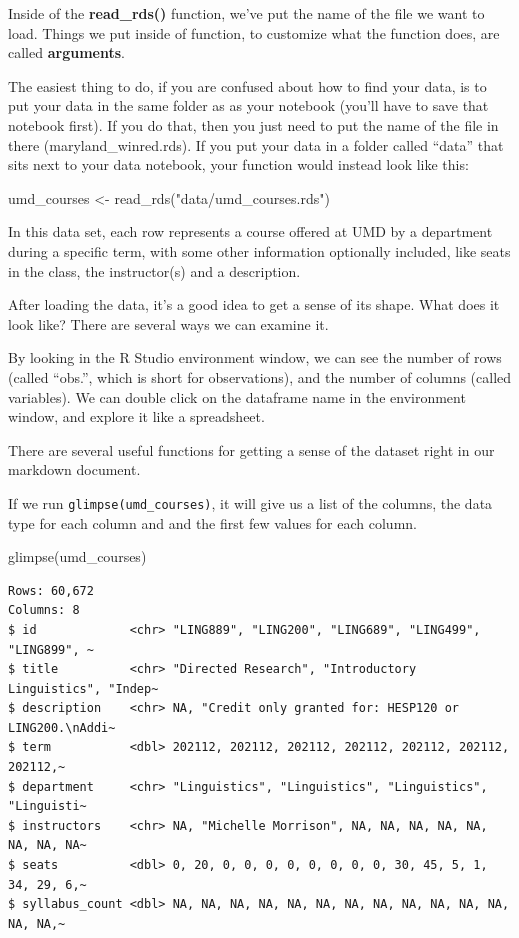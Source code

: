 \documentclass[
  letterpaper,
  DIV=11,
  numbers=noendperiod]{scrreprt}
\newenvironment{Shaded}{\begin{snugshade}}{\end{snugshade}}
\newcommand{\FunctionTok}[1]{\textcolor[rgb]{0.28,0.35,0.67}{#1}}
\newcommand{\NormalTok}[1]{\textcolor[rgb]{0.00,0.23,0.31}{#1}}
\newcommand{\OtherTok}[1]{\textcolor[rgb]{0.00,0.23,0.31}{#1}}
\newcommand{\StringTok}[1]{\textcolor[rgb]{0.13,0.47,0.30}{#1}}
\begin{document}
Inside of the \textbf{read\_rds()} function, we've put the name of the
file we want to load. Things we put inside of function, to customize
what the function does, are called \textbf{arguments}.

The easiest thing to do, if you are confused about how to find your
data, is to put your data in the same folder as as your notebook (you'll
have to save that notebook first). If you do that, then you just need to
put the name of the file in there (maryland\_winred.rds). If you put
your data in a folder called ``data'' that sits next to your data
notebook, your function would instead look like this:

\begin{Shaded}
\begin{Highlighting}[]
\NormalTok{umd\_courses }\OtherTok{\textless{}{-}} \FunctionTok{read\_rds}\NormalTok{(}\StringTok{"data/umd\_courses.rds"}\NormalTok{)}
\end{Highlighting}
\end{Shaded}

In this data set, each row represents a course offered at UMD by a
department during a specific term, with some other information
optionally included, like seats in the class, the instructor(s) and a
description.

After loading the data, it's a good idea to get a sense of its shape.
What does it look like? There are several ways we can examine it.

By looking in the R Studio environment window, we can see the number of
rows (called ``obs.'', which is short for observations), and the number
of columns (called variables). We can double click on the dataframe name
in the environment window, and explore it like a spreadsheet.

There are several useful functions for getting a sense of the dataset
right in our markdown document.

If we run \texttt{glimpse(umd\_courses)}, it will give us a list of the
columns, the data type for each column and and the first few values for
each column.

\begin{Shaded}
\begin{Highlighting}[]
\FunctionTok{glimpse}\NormalTok{(umd\_courses)}
\end{Highlighting}
\end{Shaded}

\begin{verbatim}
Rows: 60,672
Columns: 8
$ id             <chr> "LING889", "LING200", "LING689", "LING499", "LING899", ~
$ title          <chr> "Directed Research", "Introductory Linguistics", "Indep~
$ description    <chr> NA, "Credit only granted for: HESP120 or LING200.\nAddi~
$ term           <dbl> 202112, 202112, 202112, 202112, 202112, 202112, 202112,~
$ department     <chr> "Linguistics", "Linguistics", "Linguistics", "Linguisti~
$ instructors    <chr> NA, "Michelle Morrison", NA, NA, NA, NA, NA, NA, NA, NA~
$ seats          <dbl> 0, 20, 0, 0, 0, 0, 0, 0, 0, 0, 30, 45, 5, 1, 34, 29, 6,~
$ syllabus_count <dbl> NA, NA, NA, NA, NA, NA, NA, NA, NA, NA, NA, NA, NA, NA,~
\end{verbatim}
\end{document}
